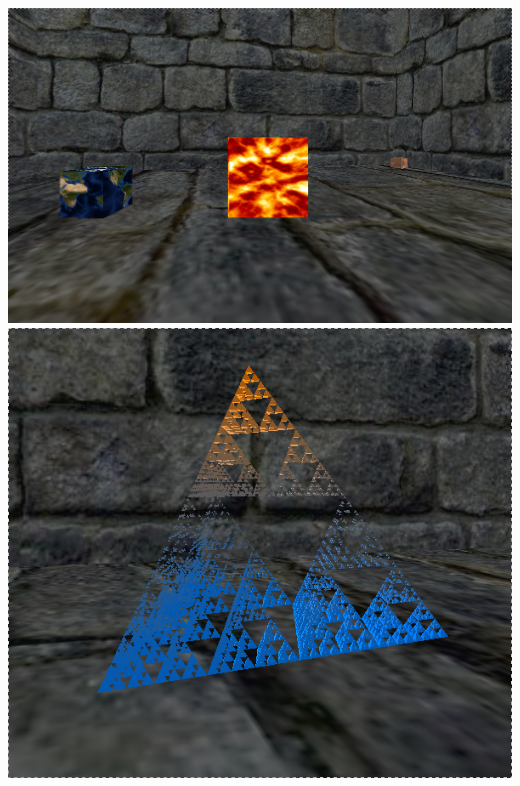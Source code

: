 \documentclass[10pt]{article}
\begin{document}
    \includegraphics[scale=0.3]{rr3.png}
    \includegraphics[scale=0.3]{rr4.png}
\end{document}
